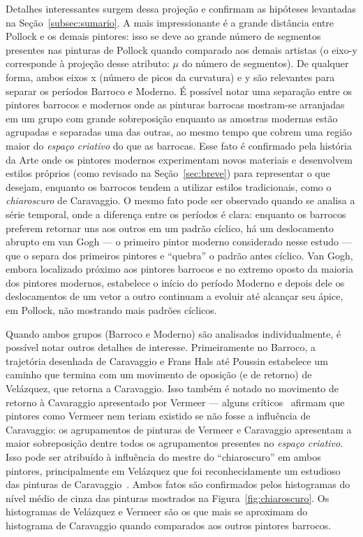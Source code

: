 Detalhes interessantes surgem dessa projeção e confirmam as hipóteses
levantadas na Seção~\ref{subsec:sumario}. A mais impressionante é a
grande distância entre Pollock e os demais pintores: isso se deve ao
grande número de segmentos presentes nas pinturas de Pollock quando
comparado aos demais artistas (o eixo-y corresponde à projeção desse
atributo: $\mu$ do número de segmentos). De qualquer forma, ambos
eixos x (número de picos da curvatura) e y são relevantes para separar
os períodos Barroco e Moderno. É possível notar uma separação entre os
pintores barrocos e modernos onde as pinturas barrocas mostram-se
arranjadas em um grupo com grande sobreposição enquanto as amostras
modernas estão agrupadas e separadas uma das outras, ao mesmo tempo
que cobrem uma região maior do \textit{espaço criativo} do que as
barrocas. Esse fato é confirmado pela história da Arte onde os
pintores modernos experimentam novos materiais e desenvolvem estilos
próprios (como revisado na Seção~\ref{sec:breve}) para representar o
que desejam, enquanto os barrocos tendem a utilizar estilos
tradicionais, como o \textit{chiaroscuro} de Caravaggio. O mesmo fato
pode ser observado quando se analisa a série temporal, onde a
diferença entre os períodos é clara: enquanto os barrocos preferem
retornar uns aos outros em um padrão cíclico, há um deslocamento
abrupto em van Gogh --- o primeiro pintor moderno considerado nesse
estudo --- que o separa dos primeiros pintores e ``quebra'' o padrão
antes cíclico. Van Gogh, embora localizado próximo aos pintores
barrocos e no extremo oposto da maioria dos pintores modernos,
estabelece o início do período Moderno e depois dele os deslocamentos
de um vetor a outro continuam a evoluir até alcançar seu ápice, em
Pollock, não mostrando mais padrões cíclicos.

Quando ambos grupos (Barroco e Moderno) são analisados
individualmente, é possível notar outros detalhes de
interesse. Primeiramente no Barroco, a trajetória desenhada de
Caravaggio e Frans Hals até Poussin estabelece um caminho que termina
com um movimento de oposição (e de retorno) de Vel\'{a}zquez, que
retorna a Caravaggio.  Isso também é notado no movimento de retorno à
Cavaraggio apresentado por Vermeer --- alguns críticos~\cite{lambert}
afirmam que pintores como Vermeer nem teriam existido se não fosse a
influência de Caravaggio: os agrupamentos de pinturas de Vermeer e
Caravaggio apresentam a maior sobreposição dentre todos os
agrupamentos presentes no \textit{espaço criativo}. Isso pode ser
atribuído à influência do mestre do ``chiaroscuro'' em ambos pintores,
principalmente em Vel\'{a}zquez que foi reconhecidamente um estudioso
das pinturas de Caravaggio~\cite{gombrich}. Ambos fatos são
confirmados pelos histogramas do nível médio de cinza das pinturas
mostrados na Figura~\ref{fig:chiaroscuro}. Os histogramas de Velázquez
e Vermeer são os que mais se aproximam do histograma de Caravaggio
quando comparados aos outros pintores barrocos.

